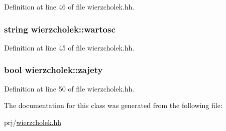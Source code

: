 \-Definition at line 46 of file wierzcholek.\-hh.

\hypertarget{classwierzcholek_a19aa16bf7e01a987fcc360e5da902209}{
\subsubsection[{wartosc}]{\setlength{\rightskip}{0pt plus 5cm}string {\bf wierzcholek\-::wartosc}}}\label{classwierzcholek_a19aa16bf7e01a987fcc360e5da902209}


\-Definition at line 45 of file wierzcholek.\-hh.

\hypertarget{classwierzcholek_ad67644b5f408397f28d7150d3bac76d2}{
\subsubsection[{zajety}]{\setlength{\rightskip}{0pt plus 5cm}bool {\bf wierzcholek\-::zajety}}}\label{classwierzcholek_ad67644b5f408397f28d7150d3bac76d2}


\-Definition at line 50 of file wierzcholek.\-hh.



\-The documentation for this class was generated from the following file\-:\begin{DoxyCompactItemize}
\item 
prj/\hyperlink{wierzcholek_8hh}{wierzcholek.\-hh}\end{DoxyCompactItemize}
